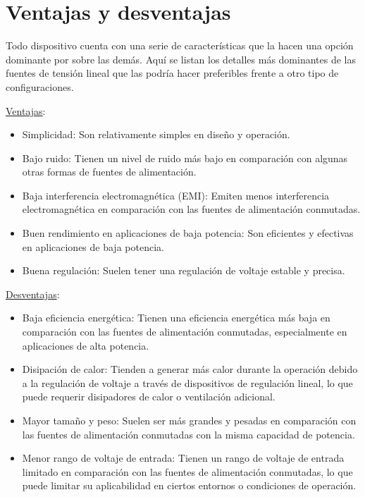 \section{Ventajas y desventajas}\par 
Todo dispositivo cuenta con una serie de características que la hacen una opción dominante por sobre las demás. Aquí se listan los detalles más dominantes de las fuentes de tensión lineal que las podría hacer preferibles frente a otro tipo de configuraciones.\par 
\underline{Ventajas}:
\begin{itemize}
    \item Simplicidad: Son relativamente simples en diseño y operación.
    \item Bajo ruido: Tienen un nivel de ruido más bajo en comparación con algunas otras formas de fuentes de alimentación.
    \item Baja interferencia electromagnética (EMI): Emiten menos interferencia electromagnética en comparación con las fuentes de alimentación conmutadas.
    \item Buen rendimiento en aplicaciones de baja potencia: Son eficientes y efectivas en aplicaciones de baja potencia.
    \item Buena regulación: Suelen tener una regulación de voltaje estable y precisa.
\end{itemize}\par 
\underline{Desventajas}:
\begin{itemize}
    \item Baja eficiencia energética: Tienen una eficiencia energética más baja en comparación con las fuentes de alimentación conmutadas, especialmente en aplicaciones de alta potencia.
    \item Disipación de calor: Tienden a generar más calor durante la operación debido a la regulación de voltaje a través de dispositivos de regulación lineal, lo que puede requerir disipadores de calor o ventilación adicional.
    \item Mayor tamaño y peso: Suelen ser más grandes y pesadas en comparación con las fuentes de alimentación conmutadas con la misma capacidad de potencia.
    \item Menor rango de voltaje de entrada: Tienen un rango de voltaje de entrada limitado en comparación con las fuentes de alimentación conmutadas, lo que puede limitar su aplicabilidad en ciertos entornos o condiciones de operación.
\end{itemize}

